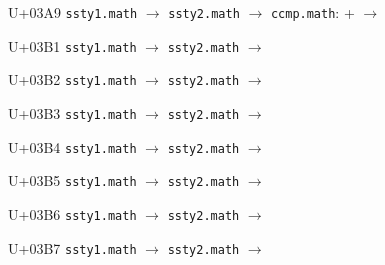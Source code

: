 \documentclass{article}
\begin{document}
\begin{substitutions}
\goodbreak

U+03A9  \linebreak
    \texttt{ssty1.math} $\to$  \linebreak
    \texttt{ssty2.math} $\to$  \linebreak
\texttt{ccmp.math}:
\linebreak\null\quad{} \space +  \space $\to$  

\goodbreak

U+03B1  \linebreak
    \texttt{ssty1.math} $\to$  \linebreak
    \texttt{ssty2.math} $\to$  

\goodbreak

U+03B2  \linebreak
    \texttt{ssty1.math} $\to$  \linebreak
    \texttt{ssty2.math} $\to$  

\goodbreak

U+03B3  \linebreak
    \texttt{ssty1.math} $\to$  \linebreak
    \texttt{ssty2.math} $\to$  

\goodbreak

U+03B4  \linebreak
    \texttt{ssty1.math} $\to$  \linebreak
    \texttt{ssty2.math} $\to$  

\goodbreak

U+03B5  \linebreak
    \texttt{ssty1.math} $\to$  \linebreak
    \texttt{ssty2.math} $\to$  

\goodbreak

U+03B6  \linebreak
    \texttt{ssty1.math} $\to$  \linebreak
    \texttt{ssty2.math} $\to$  

\goodbreak

U+03B7  \linebreak
    \texttt{ssty1.math} $\to$  \linebreak
    \texttt{ssty2.math} $\to$  


\end{substitutions}
\end{document}
